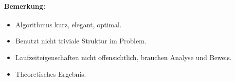 \begin{description}
		\paragraph{Bemerkung:}
		\begin{itemize}
		 \item Algorithmus kurz, elegant, optimal.
		 \item Benutzt nicht triviale Struktur im Problem.
		 \item Laufzeiteigenschaften nicht offensichtlich, brauchen Analyse und Beweis.
		 \item Theoretisches Ergebnis.
		\end{itemize}

\end{description}

